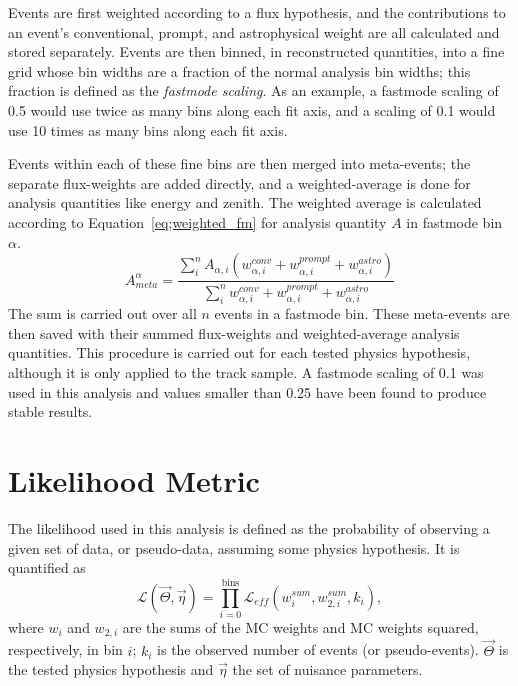\documentclass[main.tex]{subfiles}
\begin{document}
Events are first weighted according to a flux hypothesis, and the contributions to an event's conventional, prompt, and astrophysical weight are all calculated and stored separately. 
Events are then binned, in reconstructed quantities, into a fine grid whose bin widths are a fraction of the normal analysis bin widths; this fraction is defined as the \textit{fastmode scaling}.
As an example, a fastmode scaling of 0.5 would use twice as many bins along each fit axis, and a scaling of 0.1 would use 10 times as many bins along each fit axis. 


Events within each of these fine bins are then merged into meta-events; the separate flux-weights are added directly, and a weighted-average is done for analysis quantities like energy and zenith.
The weighted average is calculated according to Equation~\eqref{eq;weighted_fm} for analysis quantity $A$ in fastmode bin $\alpha$.
\begin{equation}\label{eq;weighted_fm}
A_{meta}^{\alpha} = \dfrac{\sum_{i}^{n} A_{\alpha, i} \left(w_{\alpha, i}^{conv} + w_{\alpha,i}^{prompt} + w_{\alpha,i}^{astro}\right) }{\sum_{i}^{n} w_{\alpha, i}^{conv} + w_{\alpha,i}^{prompt} + w_{\alpha,i}^{astro}}
\end{equation}
The sum is carried out over all $n$ events in a fastmode bin. 
These meta-events are then saved with their summed flux-weights and weighted-average analysis quantities.
This procedure is carried out for each tested physics hypothesis, although it is only applied to the track sample. 
A fastmode scaling of 0.1 was used in this analysis and values smaller than 0.25 have been found to produce stable results. 


\section{Likelihood Metric}\label{sect:llh_metric}

The likelihood used in this analysis is defined as the probability of observing a given set of data, or pseudo-data, assuming some physics hypothesis.
It is quantified as 
\begin{equation}
    \mathcal{L}(\vec{\Theta}, \vec{\eta}) = \prod_{i=0}^{\text{bins}} \mathcal{L}_{eff}\left( w_{i}^{sum}, w_{2,i}^{sum}, k_{i} \right),
\end{equation}
where $w_{i}$ and $w_{2,i}$ are the sums of the MC weights and MC weights squared, respectively, in bin $i$; $k_{i}$ is the observed number of events (or pseudo-events). 
$\vec{\Theta}$ is the tested physics hypothesis and $\vec{\eta}$ the set of nuisance parameters. 
\end{document}
